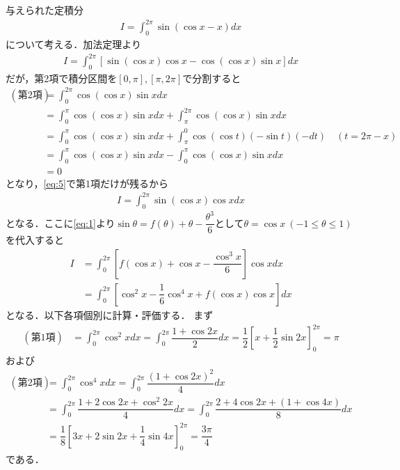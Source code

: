 \documentclass[../../main.tex]{subfiles}
\begin{document}
与えられた定積分
\begin{align}
  I = \int_{0}^{2\pi} \sin(\cos x-x) dx \label{eq:4}
\end{align}
について考える．加法定理より
\begin{align}
  I = \int_{0}^{2\pi} \left[\sin(\cos x)\cos x - \cos(\cos x)\sin x\right] dx \label{eq:5}
\end{align}
だが，第2項で積分区間を$[0,\pi],[\pi,2\pi]$で分割すると
\begin{align}
  (\text{第2項})
  &= \int_{0}^{2\pi}\cos(\cos x)\sin x dx \\
  &= \int_{0}^{\pi}\cos(\cos x)\sin x dx + \int_{\pi}^{2\pi}\cos(\cos x)\sin x dx \\
  &= \int_{0}^{\pi}\cos(\cos x)\sin x dx + \int_{\pi}^{0}\cos(\cos t)(-\sin t)(-dt) \quad (t=2\pi-x) \\
  &= \int_{0}^{\pi}\cos(\cos x)\sin x dx - \int_{0}^{\pi}\cos(\cos x)\sin x dx  \\
  &=0
\end{align}
となり，\cref{eq:5}で第1項だけが残るから
\begin{align}
  I = \int_{0}^{2\pi} \sin(\cos x)\cos x dx \label{eq:6}
\end{align}
となる．ここに\cref{eq:1}より$\sin \theta = f(\theta) + \theta-\dfrac{\theta^3}{6}$として$\theta=\cos x \ (-1 \le \theta \le 1)$を代入すると
\begin{align}
  I
  &= \int_{0}^{2\pi} \left[f(\cos x) + \cos x - \dfrac{\cos^3x}{6}\right]\cos x dx \\
  &= \int_{0}^{2\pi} \left[\cos^2x - \dfrac{1}{6}\cos^4x + f(\cos x)\cos x\right]dx \label{eq:7}
\end{align}
となる．以下各項個別に計算・評価する．
まず
\begin{align}
  (\text{第1項})
  &= \int_{0}^{2\pi}\cos^2x dx
  = \int_{0}^{2\pi}\dfrac{1+\cos 2x}{2} dx
  = \dfrac{1}{2}\left[x + \dfrac{1}{2}\sin 2x\right]_{0}^{2\pi}
  = \pi
\end{align}
および
\begin{align}
  (\text{第2項})
  &= \int_{0}^{2\pi}\cos^4x dx
  = \int_{0}^{2\pi}\dfrac{(1+\cos 2x)^2}{4} dx \\
  & = \int_{0}^{2\pi}\dfrac{1+2\cos 2x + \cos^2 2x}{4} dx
  = \int_{0}^{2\pi}\dfrac{2+4\cos 2x + (1+\cos 4x)}{8} dx \\
  & = \dfrac{1}{8}\left[3x+ 2\sin 2x + \dfrac{1}{4}\sin 4x\right]_{0}^{2\pi}
  = \dfrac{3\pi}{4}
\end{align}
である．
\end{document}
